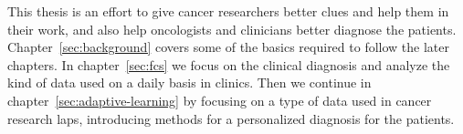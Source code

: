 This thesis is an effort to give cancer researchers better clues and help them in their work, and also help oncologists and clinicians better diagnose the patients. Chapter~\ref{sec:background} covers some of the basics required to follow the later chapters. In chapter~\ref{sec:fcs} we focus on the clinical diagnosis and analyze the kind of data used on a daily basis in clinics. Then we continue in chapter~\ref{sec:adaptive-learning} by focusing on a type of data used in cancer research laps, introducing methods for a personalized diagnosis for the patients.


